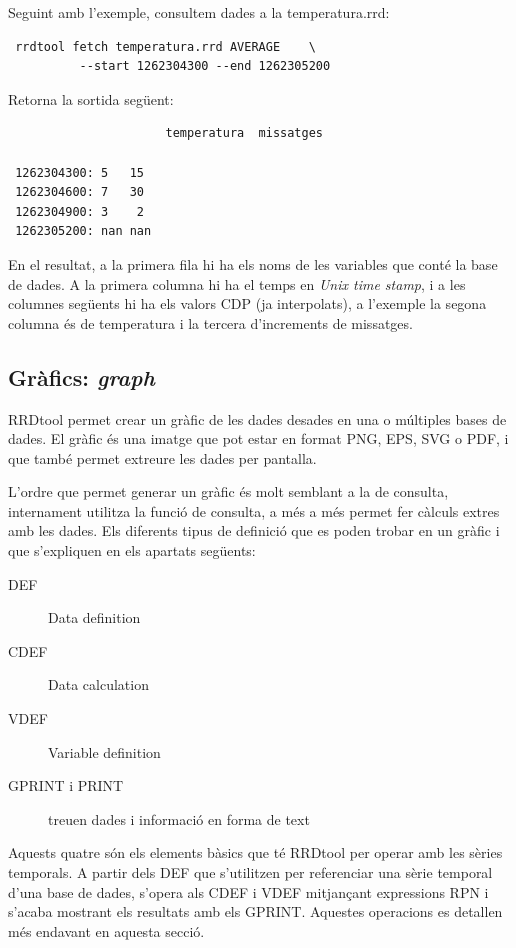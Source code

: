 Seguint amb l'exemple, consultem dades a la temperatura.rrd:

\begin{verbatim}
 rrdtool fetch temperatura.rrd AVERAGE    \
          --start 1262304300 --end 1262305200
\end{verbatim}

Retorna la sortida següent:
\begin{lstlisting}
                      temperatura  missatges

 1262304300: 5   15
 1262304600: 7   30
 1262304900: 3    2
 1262305200: nan nan
\end{lstlisting}


En el resultat, a la primera fila hi ha els noms de les variables que conté la base de dades. A la primera columna hi ha el temps en \emph{Unix time stamp}, i a les columnes següents hi ha els valors CDP (ja interpolats), a l'exemple la segona columna és de temperatura i la tercera d'increments de missatges.



\subsection{Gràfics: \emph{graph}}\label{RRDgraph}

RRDtool permet crear un gràfic de les dades desades en una o múltiples bases de dades. El gràfic és una imatge que pot estar en format PNG, EPS, SVG o PDF,  i que també permet extreure les dades per pantalla. 

L'ordre que permet generar un gràfic és molt semblant a la de consulta, internament utilitza la funció de consulta, a més a més permet fer càlculs extres amb les dades. Els diferents tipus de definició que es poden trobar en un gràfic i que s'expliquen en els apartats següents:

\begin{description}
\item[DEF]  Data definition
\item [CDEF]  Data calculation
\item [VDEF] Variable definition 
\item [GPRINT i PRINT] treuen dades i informació en forma de text
\end{description}

Aquests quatre són els elements bàsics que té RRDtool per operar amb les sèries temporals. A partir dels DEF que s'utilitzen per referenciar una sèrie temporal d'una base de dades, s'opera als CDEF i VDEF mitjançant expressions RPN i s'acaba mostrant els resultats amb els GPRINT. Aquestes operacions es detallen més endavant en aquesta secció.

